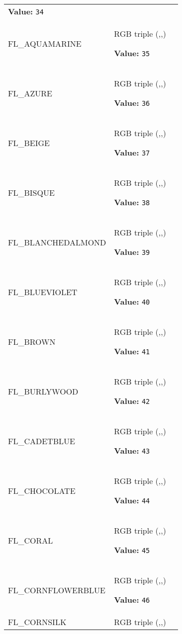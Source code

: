 \begin{longtable}{|p{\varnamewidth}|p{\vardescrwidth}|l}
\textbf{Value:} 
{\tt 34}&\\
\cline{1-2}
\raggedright F\-L\-\_\-A\-Q\-U\-A\-M\-A\-R\-I\-N\-E\- & \raggedright RGB triple (,,)

\textbf{Value:} 
{\tt 35}&\\
\cline{1-2}
\raggedright F\-L\-\_\-A\-Z\-U\-R\-E\- & \raggedright RGB triple (,,)

\textbf{Value:} 
{\tt 36}&\\
\cline{1-2}
\raggedright F\-L\-\_\-B\-E\-I\-G\-E\- & \raggedright RGB triple (,,)

\textbf{Value:} 
{\tt 37}&\\
\cline{1-2}
\raggedright F\-L\-\_\-B\-I\-S\-Q\-U\-E\- & \raggedright RGB triple (,,)

\textbf{Value:} 
{\tt 38}&\\
\cline{1-2}
\raggedright F\-L\-\_\-B\-L\-A\-N\-C\-H\-E\-D\-A\-L\-M\-O\-N\-D\- & \raggedright RGB triple (,,)

\textbf{Value:} 
{\tt 39}&\\
\cline{1-2}
\raggedright F\-L\-\_\-B\-L\-U\-E\-V\-I\-O\-L\-E\-T\- & \raggedright RGB triple (,,)

\textbf{Value:} 
{\tt 40}&\\
\cline{1-2}
\raggedright F\-L\-\_\-B\-R\-O\-W\-N\- & \raggedright RGB triple (,,)

\textbf{Value:} 
{\tt 41}&\\
\cline{1-2}
\raggedright F\-L\-\_\-B\-U\-R\-L\-Y\-W\-O\-O\-D\- & \raggedright RGB triple (,,)

\textbf{Value:} 
{\tt 42}&\\
\cline{1-2}
\raggedright F\-L\-\_\-C\-A\-D\-E\-T\-B\-L\-U\-E\- & \raggedright RGB triple (,,)

\textbf{Value:} 
{\tt 43}&\\
\cline{1-2}
\raggedright F\-L\-\_\-C\-H\-O\-C\-O\-L\-A\-T\-E\- & \raggedright RGB triple (,,)

\textbf{Value:} 
{\tt 44}&\\
\cline{1-2}
\raggedright F\-L\-\_\-C\-O\-R\-A\-L\- & \raggedright RGB triple (,,)

\textbf{Value:} 
{\tt 45}&\\
\cline{1-2}
\raggedright F\-L\-\_\-C\-O\-R\-N\-F\-L\-O\-W\-E\-R\-B\-L\-U\-E\- & \raggedright RGB triple (,,)

\textbf{Value:} 
{\tt 46}&\\
\cline{1-2}
\raggedright F\-L\-\_\-C\-O\-R\-N\-S\-I\-L\-K\- & \raggedright RGB triple (,,)


\end{longtable}
